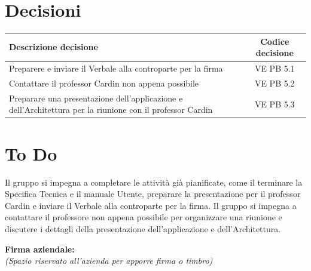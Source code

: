 \documentclass[a4paper,12pt]{article}
\newcommand{\ignoreglossary}{}
\begin{document}
\section{Decisioni}
\begin{center}
\small
\renewcommand{\arraystretch}{1.2} 
\begin{tabular}{|p{}|c|}
\hline
\rowcolor{gray!60} 
\textbf{Descrizione decisione} & \textbf{Codice decisione} \\
\hline
Preparere e inviare il Verbale alla controparte per la firma & VE \ignoreglossary{PB} 5.1 \\
\hline
Contattare il professor Cardin non appena possibile & VE \ignoreglossary{PB} 5.2 \\
\hline
Preparare una presentazione dell'applicazione e dell'Architettura per la riunione con il professor Cardin & VE \ignoreglossary{PB} 5.3 \\
\hline
\end{tabular}
\end{center}

\section{To Do}

Il gruppo si impegna a completare le attività già pianificate, come il terminare la Specifica Tecnica e il manuale Utente, preparare la presentazione per il professor Cardin e inviare il Verbale alla controparte per la firma. Il gruppo si impegna a contattare il professore non appena possibile per organizzare una riunione e discutere i dettagli della presentazione dell'applicazione e dell'Architettura.

\vspace*{\fill}
\noindent
\begin{minipage}{0.60\textwidth}
    {\small
    \textbf{Firma aziendale:}\\[0.3cm]
    \textit{(Spazio riservato all’azienda per apporre firma o timbro)}\\[0.8cm]
    \fbox{\rule{0pt}{2.5cm}\rule{5cm}{0pt}} 
    }
\end{minipage}
\end{document}
